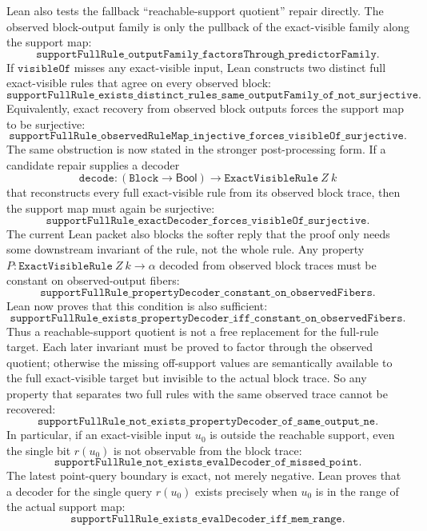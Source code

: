 \documentclass[11pt]{article}
\theoremstyle{remark}
\begin{document}
Lean also tests the fallback ``reachable-support quotient'' repair directly.
The observed block-output family is only the pullback of the exact-visible
family along the support map:
\[
  \texttt{supportFullRule\_outputFamily\_factorsThrough\_predictorFamily}.
\]
If \(\texttt{visibleOf}\) misses any exact-visible input, Lean constructs two
distinct full exact-visible rules that agree on every observed block:
\[
  \texttt{supportFullRule\_exists\_distinct\_rules\_same\_outputFamily\_of\_not\_surjective}.
\]
Equivalently, exact recovery from observed block outputs forces the support
map to be surjective:
\[
  \texttt{supportFullRule\_observedRuleMap\_injective\_forces\_visibleOf\_surjective}.
\]
The same obstruction is now stated in the stronger post-processing form.  If a
candidate repair supplies a decoder
\[
  \texttt{decode} : (\texttt{Block}\to\mathsf{Bool})\to
  \texttt{ExactVisibleRule}\ Z\ k
\]
that reconstructs every full exact-visible rule from its observed block trace,
then the support map must again be surjective:
\[
  \texttt{supportFullRule\_exactDecoder\_forces\_visibleOf\_surjective}.
\]
The current Lean packet also blocks the softer reply that the proof only needs
some downstream invariant of the rule, not the whole rule.  Any property
\(P : \texttt{ExactVisibleRule}\ Z\ k \to \alpha\) decoded from observed block
traces must be constant on observed-output fibers:
\[
  \texttt{supportFullRule\_propertyDecoder\_constant\_on\_observedFibers}.
\]
Lean now proves that this condition is also sufficient:
\[
  \texttt{supportFullRule\_exists\_propertyDecoder\_iff\_constant\_on\_observedFibers}.
\]
Thus a reachable-support quotient is not a free replacement for the full-rule
target.  Each later invariant must be proved to factor through the observed
quotient; otherwise the missing off-support values are semantically available
to the full exact-visible target but invisible to the actual block trace.
So any property that separates two full rules with the same observed trace
cannot be recovered:
\[
  \texttt{supportFullRule\_not\_exists\_propertyDecoder\_of\_same\_output\_ne}.
\]
In particular, if an exact-visible input \(u_0\) is outside the reachable
support, even the single bit \(r(u_0)\) is not observable from the block trace:
\[
  \texttt{supportFullRule\_not\_exists\_evalDecoder\_of\_missed\_point}.
\]
The latest point-query boundary is exact, not merely negative.  Lean proves
that a decoder for the single query \(r(u_0)\) exists precisely when \(u_0\)
is in the range of the actual support map:
\[
  \texttt{supportFullRule\_exists\_evalDecoder\_iff\_mem\_range}.
\]
\end{document}
